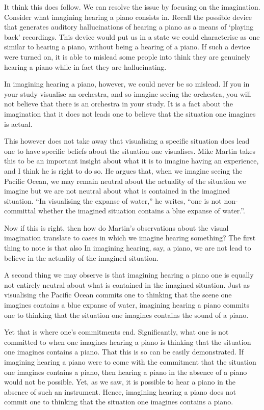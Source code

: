 \documentclass[sloppy, journal, git, bytitle, dodraft]{humapap}
\begin{document}
It think this does follow. We can resolve the issue by focusing on the imagination. Consider what imagining hearing a piano consists in. Recall the possible device that generates auditory hallucinations of hearing a piano as a means of `playing back' recordings. This device would put us in a state we could characterise as one similar to hearing a piano, without being a hearing of a piano. If such a device were turned on, it is able to mislead some people into think they are genuinely hearing a piano while in fact they are hallucinating. 

In imagining hearing a piano, however, we could never be so mislead. If you in your study visualise an orchestra, and so imagine seeing the orchestra, you will not believe that there is an orchestra in your study. It is a fact about the imagination that it does not leads one to believe that the situation one imagines is actual. 

This however does not take away that visualising a specific situation does lead one to have specific beliefs about the situation one visualises. Mike Martin takes this to be an important insight about what it is to imagine having an experience, and I think he is right to do so. He argues that, when we imagine seeing the Pacific Ocean, we may remain neutral about the actuality of the situation we imagine but we are not neutral about what is contained in the imagined situation. ``In visualising the expanse of water,'' he writes, ``one is not non-committal whether the imagined situation contains a blue expanse of water.''\autocite[p. 414]{martin2002aa}. 

Now if this is right, then how do Martin's observations about the visual imagination translate to cases in which we imagine hearing something? The first thing to note is that also In imagining hearing, say, a piano, we are not lead to believe in the actuality of the imagined situation. 

A second thing we may observe is that imagining hearing a piano one is equally not entirely neutral about what is contained in the imagined situation. Just as visualising the Pacific Ocean commits one to thinking that the scene one imagines contains a blue expanse of water, imagining hearing a piano commits one to thinking that the situation one imagines contains the sound of a piano.

Yet that is where one's commitments end. Significantly, what one is not committed to when one imagines hearing a piano is thinking that the situation one imagines contains a piano. That this is so can be easily demonstrated. If imagining hearing a piano were to come with the commitment that the situation one imagines contains a piano, then hearing a piano in the absence of a piano would not be possible. Yet, as we saw, it is possible to hear a piano in the absence of such an instrument. Hence, imagining hearing a piano does not commit one to thinking that the situation one imagines contains a piano.
\end{document}
